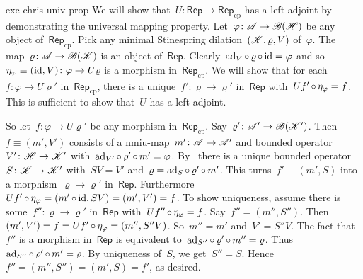 \begin{solution}{exc-chris-univ-prop}%
We will show that~$U\colon \mathsf{Rep} \to \mathsf{Rep}_{\mathrm{cp}}$
    has a left-adjoint by demonstrating the universal mapping property.
    Let~$\varphi\colon \mathscr{A} \to \mathscr{B}(\mathscr{H})$ be any object of~$\mathsf{Rep}_{\mathrm{cp}}$.
    Pick any minimal Stinespring dilation~$(\mathscr{K}, \varrho, V)$ of~$\varphi$.
The map~$\varrho\colon \mathscr{A}\to \mathscr{B}(\mathscr{K})$ is an object
        of~$\mathsf{Rep}$.
Clearly~$\mathrm{ad}_V \mathop{\circ} \varrho \mathop{\circ} \mathrm{id} = \varphi$
    and so~$\eta_\varphi\equiv (\mathrm{id},V)\colon \varphi \to U\varrho$
        is a morphism in~$\mathsf{Rep}_{\mathrm{cp}}$.
We will show that for each~$f\colon \varphi \to U\varrho'$
        in~$\mathsf{Rep}_{\mathrm{cp}}$,
    there is a unique~$f'\colon \varrho \to \varrho'$
    in~$\mathsf{Rep}$ with~$Uf' \mathop{\circ} \eta_\varphi = f$.
This is sufficient to show that~$U$
    has a left adjoint.

    So let~$f\colon \varphi\to U\varrho'$ be any morphism
        in~$\mathsf{Rep}_{\mathrm{cp}}$.
Say~$\varrho'\colon \mathscr{A}' \to \mathscr{B}(\mathscr{K}')$.
    Then~$f \equiv (m', V')$ consists of
    a nmiu-map~$m'\colon \mathscr{A} \to \mathscr{A}'$
    and bounded operator~$V' \colon \mathscr{H} \to \mathscr{K}'$
    with~$\mathrm{ad}_{V'} \mathop{\circ} \varrho' \mathop{\circ} m' = \varphi$.
By~
    there is a unique bounded operator~$S\colon \mathscr{K} \to \mathscr{K}'$
        with~$SV = V'$ and~$\varrho = \mathrm{ad}_S \mathop{\circ} \varrho' \mathop{\circ} m'$.
This turns~$f' \equiv(m',S)$ into a
    morphism~$\varrho \to \varrho'$ in~$\mathsf{Rep}$.
Furthermore~$Uf' \mathop{\circ} \eta_\varphi
                = (m' \mathop{\circ} \mathrm{id}, SV) = (m',V') = f$.
To show uniqueness, assume
        there is some~$f'' \colon \varrho \to \varrho'$
        in~$\mathsf{Rep}$
        with~$Uf'' \mathop{\circ} \eta_\varphi = f$.
Say~$f'' = (m'',S'')$.
    Then~$(m',V') = f = Uf' \mathop{\circ} \eta_\varphi = (m'', S''V)$.
So~$m''=m'$ and~$V' = S''V$.
The fact that~$f''$ is a morphism in~$\mathsf{Rep}$
    is
    equivalent to~$\mathrm{ad}_{S''} \mathop{\circ} \varrho' \mathop{\circ} m'' = \varrho$.
Thus~$\mathrm{ad}_{S''} \mathop{\circ} \varrho' \mathop{\circ} m' = \varrho$.
By uniqueness of~$S$, we get~$S'' = S$.
    Hence~$f''=(m'',S'') = (m',S) = f'$, as desired.
\end{solution}
